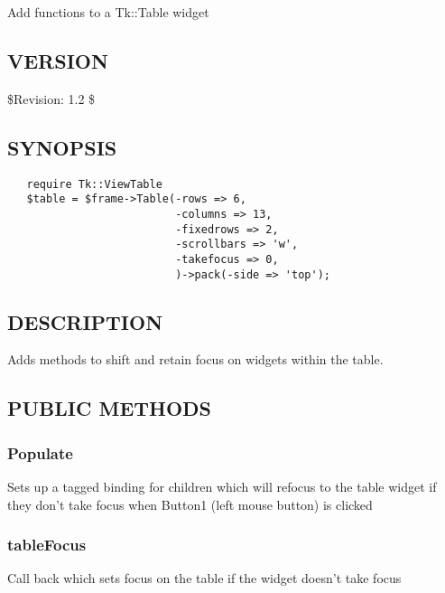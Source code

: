 \documentclass{article}
\begin{document}
Add functions to a Tk::Table widget

\subsection*{VERSION\label{Tk::ViewTable_VERSION}}


\$Revision: 1.2 \$

\subsection*{SYNOPSIS\label{Tk::ViewTable_SYNOPSIS}}
\begin{verbatim}
   require Tk::ViewTable
   $table = $frame->Table(-rows => 6,
                          -columns => 13,
                          -fixedrows => 2,
                          -scrollbars => 'w',
                          -takefocus => 0,
                          )->pack(-side => 'top');
\end{verbatim}
\subsection*{DESCRIPTION\label{Tk::ViewTable_DESCRIPTION}}


Adds methods to shift and retain focus on widgets within the table.

\subsection*{PUBLIC METHODS\label{Tk::ViewTable_PUBLIC_METHODS}}
\subsubsection*{Populate\label{Tk::ViewTable_Populate}}


Sets up a tagged binding for children which will refocus to the table widget
if they don't take focus when Button1 (left mouse button) is clicked

\subsubsection*{tableFocus\label{Tk::ViewTable_tableFocus}}


Call back which sets focus on the table if the widget doesn't take focus
\end{document}
